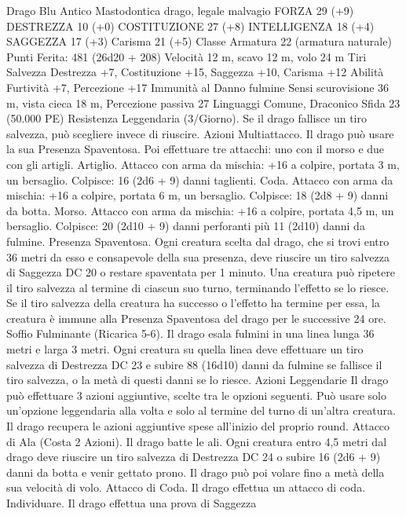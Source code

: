 \begin{multicols}{2}
Drago Blu Antico
Mastodontica drago, legale malvagio
FORZA 29 (+9)
DESTREZZA 10 (+0)
COSTITUZIONE 27 (+8)
INTELLIGENZA 18 (+4)
SAGGEZZA 17 (+3)
Carisma 21 (+5)
Classe Armatura 22 (armatura naturale)
\hspace*{0pt}\hfill{Punti Ferita}: 481 (26d20 + 208)
Velocità 12 m, scavo 12 m, volo 24 m
Tiri Salvezza Destrezza +7, Costituzione +15, Saggezza +10,
Carisma +12
Abilità Furtività +7, Percezione +17
Immunità al Danno fulmine
Sensi scurovisione 36 m, vista cieca 18 m, Percezione passiva 27
Linguaggi Comune, Draconico
Sfida 23 (50.000 PE)
Resistenza Leggendaria (3/Giorno). Se il drago fallisce un tiro
salvezza, può scegliere invece di riuscire.
Azioni
Multiattacco. Il drago può usare la sua Presenza Spaventosa. Poi
effettuare tre attacchi: uno con il morso e due con gli artigli.
Artiglio. Attacco con arma da mischia: +16 a colpire, portata 3
m, un bersaglio.
Colpisce: 16 (2d6 + 9) danni taglienti.
Coda. Attacco con arma da mischia: +16 a colpire, portata 6 m,
un bersaglio.
Colpisce: 18 (2d8 + 9) danni da botta.
Morso. Attacco con arma da mischia: +16 a colpire, portata 4,5
m, un bersaglio.
Colpisce: 20 (2d10 + 9) danni perforanti più 11 (2d10) danni da
fulmine.
Presenza Spaventosa. Ogni creatura scelta dal drago, che si trovi
entro 36 metri da esso e consapevole della sua presenza, deve
riuscire un tiro salvezza di Saggezza DC 20 o restare spaventata
per 1 minuto. Una creatura può ripetere il tiro salvezza al termine
di ciascun suo turno, terminando l’effetto se lo riesce. Se il tiro
salvezza della creatura ha successo o l’effetto ha termine per
essa, la creatura è immune alla Presenza Spaventosa del drago
per le successive 24 ore.
Soffio Fulminante (Ricarica 5-6). Il drago esala fulmini in una
linea lunga 36 metri e larga 3 metri. Ogni creatura su quella linea
deve effettuare un tiro salvezza di Destrezza DC 23 e subire 88
(16d10) danni da fulmine se fallisce il tiro salvezza, o la metà di
questi danni se lo riesce.
Azioni Leggendarie
Il drago può effettuare 3 azioni aggiuntive, scelte tra le opzioni
seguenti. Può usare solo un’opzione leggendaria alla volta e solo
al termine del turno di un’altra creatura. Il drago recupera le
azioni aggiuntive spese all’inizio del proprio round.
Attacco di Ala (Costa 2 Azioni). Il drago batte le ali. Ogni
creatura entro 4,5 metri dal drago deve riuscire un tiro salvezza
di Destrezza DC 24 o subire 16 (2d6 + 9) danni da botta e
venir gettato prono. Il drago può poi volare fino a metà della sua
velocità di volo.
Attacco di Coda. Il drago effettua un attacco di coda.
Individuare. Il drago effettua una prova di Saggezza

\end{multicols}
